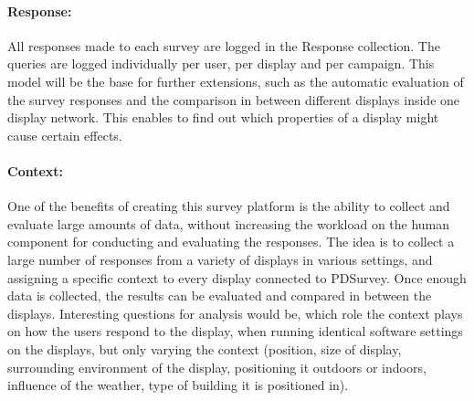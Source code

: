 	\paragraph{Response:} All responses made to each survey are logged in the Response collection. The queries are logged individually per user, per display and per campaign. This model will be the base for further extensions, such as the automatic evaluation of the survey responses and the comparison in between different displays inside one display network. This enables to find out which properties of a display might cause certain effects.

	\paragraph{Context:} One of the benefits of creating this survey platform is the ability to collect and evaluate large amounts of data, without increasing the workload on the human component for conducting and evaluating the responses. The idea is to collect a large number of responses from a variety of displays in various settings, and assigning a specific context to every display connected to PDSurvey. Once enough data is collected, the results can be evaluated and compared in between the displays. Interesting questions for analysis would be, which role the context plays on how the users respond to the display, when running identical software settings on the displays, but only varying the context (position, size of display, surrounding environment of the display, positioning it outdoors or indoors, influence of the weather, type of building it is positioned in).



